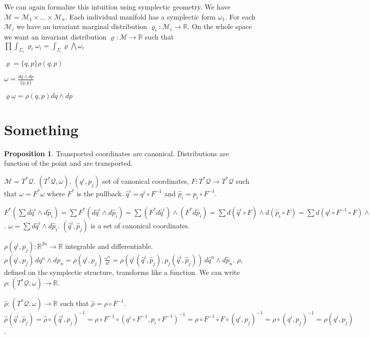 \documentclass[smallextended]{svjour3}
\numberwithin{equation}{section}
\theoremstyle{definition}
\newtheorem{prop}[equation]{Proposition}
\begin{document}
We can again formalize this intuition using symplectic geometry. We have $\mathcal{M} = \mathcal{M}_1 \times \dots \times \mathcal{M}_n$. Each individual manifold has a symplectic form $\omega_1$. For each $\mathcal{M}_i$ we have an invariant marginal distribution $\varrho_i : \mathcal{M}_i \rightarrow \mathbb{R}$. On the whole space we want an invariant distribution $\varrho : \mathcal{M} \rightarrow \mathbb{R}$ such that $\prod \int_{\Sigma_i} \varrho_i \omega_i = \int_{\Sigma} \varrho \bigwedge \omega_i $

$\varrho = \{q,p\} \rho(q,p)$

$\omega = \frac{dq\wedge dp}{\{q,p\}}$

$\varrho \omega = \rho(q,p) dq\wedge dp$


\section{Something}

\begin{prop}
	Transported coordinates are canonical. Distributions are function of the point and are transported.
\end{prop}

$\mathcal{M} = T^*\mathcal{Q}$. $(T^*\mathcal{Q}, \omega)$, $(q^i, p_j)$ set of canonical coordinates, $F: T^*\mathcal{Q} \rightarrow T^*\mathcal{Q}$ such that $\omega = F^* \omega$ where $F^*$ is the pullback. $\hat{q}^i = q^i \circ F^{-1}$ and $\hat{p}_i = p_i \circ F^{-1}$.

$F^* (\sum d\hat{q}^i \wedge d\hat{p}_i) =\sum F^* (d\hat{q}^i \wedge d\hat{p}_i) =  \sum (F^* d\hat{q}^i)\wedge (F^* d\hat{p}_i) = \sum d(\hat{q}^i \circ F)\wedge d(\hat{p}_i \circ F) = \sum d(q^i \circ F^{-1} \circ F)\wedge d(p_i \circ F^{-1} \circ F) = \sum dq^i\wedge dp_i = \omega = F^* \omega$. $\omega =  \sum d\hat{q}^i \wedge d\hat{p}_i$. $(\hat{q}^i, \hat{p}_j)$ is a set of canonical coordinates.

$\rho(q^i, p_j) : \mathbb{R}^{2n} \rightarrow \mathbb{R}$ integrable and differentiable. $\rho (q^i, p_j) \, dq^n \wedge dp_n = \rho (q^i, p_j) \, \frac{\omega^n}{n!} = \rho (q^i(\hat{q}^i, \hat{p}_j), p_j(\hat{q}^i, \hat{p}_j)) \, d\hat{q}^n \wedge d\hat{p}_n$. $\rho$, defined on the symplectic structure, transforms like a function. We can write $\rho : (T^*\mathcal{Q}, \omega) \rightarrow \mathbb{R}$.

$\hat{\rho} : (T^*\mathcal{Q}, \omega) \rightarrow \mathbb{R}$ such that $\hat{\rho} = \rho \circ F^{-1 }$. $\hat{\rho}(\hat{q}^i, \hat{p}_j) = \hat{\rho} \circ (\hat{q}^i, \hat{p}_j)^{-1} = \rho \circ F^{-1} \circ (q^i \circ F^{-1}, p_i \circ F^{-1}) ^ {-1}= \rho \circ F^{-1} \circ F \circ (q^i, p_j) ^ {-1} = \rho \circ (q^i, p_j) ^ {-1} = \rho (q^i, p_j)$.
\end{document}
